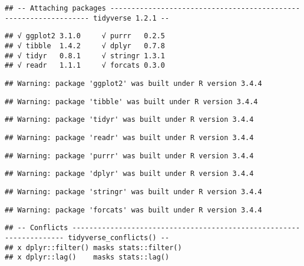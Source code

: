 \documentclass[]{article}
\begin{document}
\begin{verbatim}
## -- Attaching packages ----------------------------------------------------------------- tidyverse 1.2.1 --
\end{verbatim}

\begin{verbatim}
## √ ggplot2 3.1.0     √ purrr   0.2.5
## √ tibble  1.4.2     √ dplyr   0.7.8
## √ tidyr   0.8.1     √ stringr 1.3.1
## √ readr   1.1.1     √ forcats 0.3.0
\end{verbatim}

\begin{verbatim}
## Warning: package 'ggplot2' was built under R version 3.4.4
\end{verbatim}

\begin{verbatim}
## Warning: package 'tibble' was built under R version 3.4.4
\end{verbatim}

\begin{verbatim}
## Warning: package 'tidyr' was built under R version 3.4.4
\end{verbatim}

\begin{verbatim}
## Warning: package 'readr' was built under R version 3.4.4
\end{verbatim}

\begin{verbatim}
## Warning: package 'purrr' was built under R version 3.4.4
\end{verbatim}

\begin{verbatim}
## Warning: package 'dplyr' was built under R version 3.4.4
\end{verbatim}

\begin{verbatim}
## Warning: package 'stringr' was built under R version 3.4.4
\end{verbatim}

\begin{verbatim}
## Warning: package 'forcats' was built under R version 3.4.4
\end{verbatim}

\begin{verbatim}
## -- Conflicts -------------------------------------------------------------------- tidyverse_conflicts() --
## x dplyr::filter() masks stats::filter()
## x dplyr::lag()    masks stats::lag()
\end{verbatim}
\end{document}
